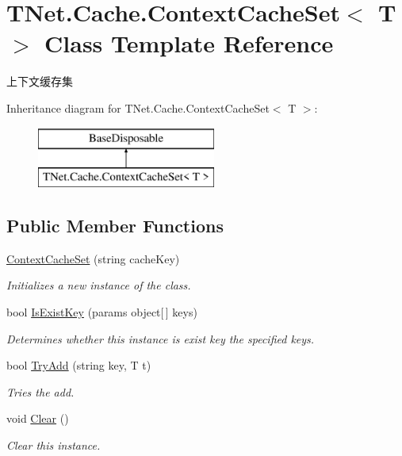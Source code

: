 \hypertarget{class_t_net_1_1_cache_1_1_context_cache_set}{}\section{T\+Net.\+Cache.\+Context\+Cache\+Set$<$ T $>$ Class Template Reference}
\label{class_t_net_1_1_cache_1_1_context_cache_set}


上下文缓存集  


Inheritance diagram for T\+Net.\+Cache.\+Context\+Cache\+Set$<$ T $>$\+:\begin{figure}[H]
\begin{center}
\leavevmode
\includegraphics[height=2.000000cm]{class_t_net_1_1_cache_1_1_context_cache_set}
\end{center}
\end{figure}
\subsection*{Public Member Functions}
\begin{DoxyCompactItemize}
\item 
\mbox{\hyperlink{class_t_net_1_1_cache_1_1_context_cache_set_a65e761d8d1a95e90a4d6ecd538d66578}{Context\+Cache\+Set}} (string cache\+Key)
\begin{DoxyCompactList}\small\item\em Initializes a new instance of the class. \end{DoxyCompactList}\item 
bool \mbox{\hyperlink{class_t_net_1_1_cache_1_1_context_cache_set_a7e2120dd078e618bae90e7a4b1bdb843}{Is\+Exist\+Key}} (params object\mbox{[}$\,$\mbox{]} keys)
\begin{DoxyCompactList}\small\item\em Determines whether this instance is exist key the specified keys. \end{DoxyCompactList}\item 
bool \mbox{\hyperlink{class_t_net_1_1_cache_1_1_context_cache_set_a73064062ddacda640d8103764b523412}{Try\+Add}} (string key, T t)
\begin{DoxyCompactList}\small\item\em Tries the add. \end{DoxyCompactList}\item 
void \mbox{\hyperlink{class_t_net_1_1_cache_1_1_context_cache_set_a6b212212174d86c0322fb5c7ebbf2a19}{Clear}} ()
\begin{DoxyCompactList}\small\item\em Clear this instance. \end{DoxyCompactList}\end{DoxyCompactItemize}
